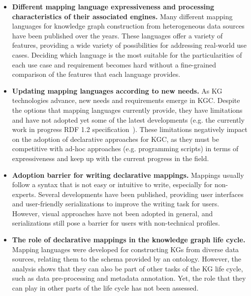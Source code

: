 \begin{itemize}
    \item \textbf{Different mapping language expressiveness and processing characteristics of their associated engines.} Many different mapping languages for knowledge graph construction from heterogeneous data sources have been published over the years. These languages offer a variety of features, providing a wide variety of possibilities for addressing real-world use cases. Deciding which language is the most suitable for the particularities of each use case and requirement becomes hard without a fine-grained comparison of the features that each language provides. 
    
    \item \textbf{Updating mapping languages according to new needs.} As KG technologies advance, new needs and requirements emerge in KGC. Despite the options that mapping languages currently provide, they have limitations and have not adopted yet some of the latest developments (e.g. the currently work in progress RDF 1.2 specification~\parencite{hartig2023rdf}). These limitations negatively impact on the adoption of declarative approaches for KGC, as they must be competitive with ad-hoc approaches (e.g. programming scripts) in terms of expressiveness and keep up with the current progress in the field.
    
    \item \textbf{Adoption barrier for writing declarative mappings.} Mappings usually follow a syntax that is not easy or intuitive to write, especially for non-experts. Several developments have been published, providing user interfaces and user-friendly serializations to improve the writing task for users. However, visual approaches have not been adopted in general, and serializations still pose a barrier for users with non-technical profiles. 

    
    \item \textbf{The role of declarative mappings in the knowledge graph life cycle.} Mapping languages were developed for constructing KGs from diverse data sources, relating them to the schema provided by an ontology. However, the analysis shows that they can also be part of other tasks of the KG life cycle, such as data pre-processing and metadata annotation. Yet, the role that they can play in other parts of the life cycle has not been assessed. 
\end{itemize}
